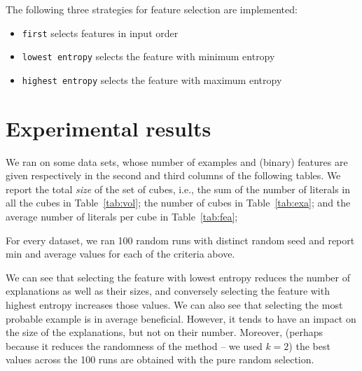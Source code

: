 \documentclass{article}
\begin{document}
The following three strategies for feature selection are implemented:
\begin{itemize}
	\item \texttt{first} selects features in input order
	\item \texttt{lowest entropy} selects the feature with minimum entropy
	\item \texttt{highest entropy} selects the feature with maximum entropy
\end{itemize}



\section*{Experimental results}

We ran \explain on some data sets, whose number of examples and (binary) features are given respectively in the second and third columns of the following tables. We report the total \emph{size} of the set of cubes, i.e., the sum of the number of literals in all the cubes in Table~\ref{tab:vol}; the number of cubes in Table~\ref{tab:exa}; and the average number of literals per cube in Table~\ref{tab:fea};


For every dataset, we ran 100 random runs with distinct random seed and report min and average values for each of the criteria above. 


We can see that selecting the feature with lowest entropy reduces the number of explanations as well as their sizes, and conversely selecting the feature with highest entropy increases those values. 
We can also see that selecting the most probable example is in average beneficial. However, it tends to have an impact on the size of the explanations, but not on their number. Moreover, (perhaps because it reduces the randomness of the method -- we used $k=2$) the best values across the 100 runs are obtained with the pure random selection.



\end{document}
